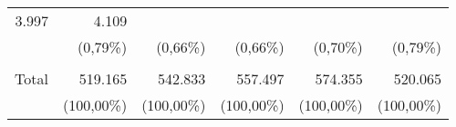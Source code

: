 \begin{tabular}{llllll}
  \multicolumn{1}{r}{3.997} &
  \multicolumn{1}{r}{4.109} \\
\multicolumn{1}{r}{} &
  \multicolumn{1}{|r}{(0,79\%)} &
  \multicolumn{1}{r}{(0,66\%)} &
  \multicolumn{1}{r}{(0,66\%)} &
  \multicolumn{1}{r}{(0,70\%)} &
  \multicolumn{1}{r}{(0,79\%)} \\
\multicolumn{1}{r}{} &
  \multicolumn{1}{|r}{} &
  \multicolumn{1}{r}{} &
  \multicolumn{1}{r}{} &
  \multicolumn{1}{r}{} &
  \multicolumn{1}{r}{} \\
\multicolumn{1}{r}{Total\hspace{1em}} &
  \multicolumn{1}{|r}{519.165} &
  \multicolumn{1}{r}{542.833} &
  \multicolumn{1}{r}{557.497} &
  \multicolumn{1}{r}{574.355} &
  \multicolumn{1}{r}{520.065} \\
\multicolumn{1}{r}{} &
  \multicolumn{1}{|r}{(100,00\%)} &
  \multicolumn{1}{r}{(100,00\%)} &
  \multicolumn{1}{r}{(100,00\%)} &
  \multicolumn{1}{r}{(100,00\%)} &
  \multicolumn{1}{r}{(100,00\%)} \\
\cline{1-6}
\end{tabular}
